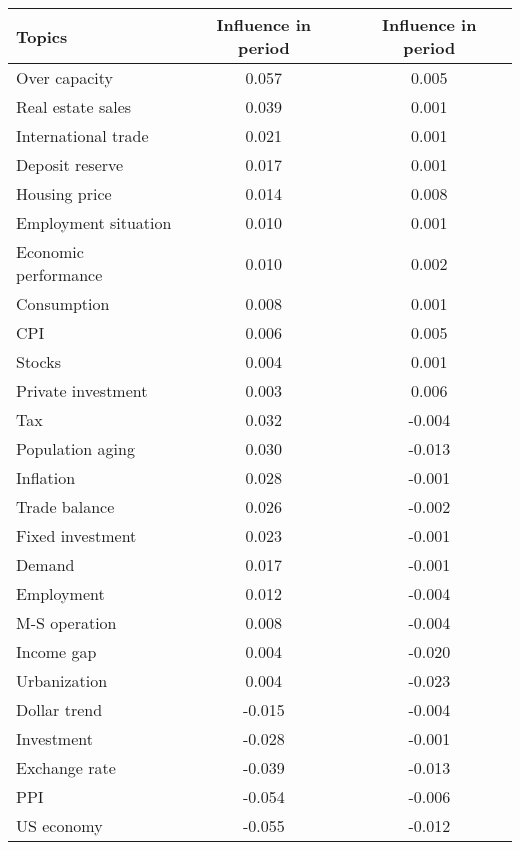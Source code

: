 \documentclass[10pt]{article}
\begin{document}
\begin {table}
 \begin {center}
 \begin {tabular} {lcc}
\hline
Topics	                         &	Influence in period 	   &	Influence in period 	\\
\hline
Over capacity	                &	0.057       &	0.005	\\
Real estate sales	        &	0.039	&	0.001	\\
International trade	        &	0.021	&	0.001	\\
Deposit reserve	                &	0.017	 &	0.001	\\
Housing price	                &	0.014	&	0.008	\\
Employment situation	&	0.010	&	0.001	\\
Economic performance	&	0.010	&	0.002	\\
Consumption	                 &	0.008	&	0.001	\\
CPI	                                  &	0.006	&	0.005	\\
Stocks	                          &	0.004	&	0.001	\\
Private investment	        &	0.003	&	0.006	\\
\hline
Tax	                                 &	0.032	&	-0.004	\\
Population aging	        &	0.030	&	-0.013	\\
Inflation	                         &	0.028	&	-0.001	\\
Trade balance	                 &	0.026	&	-0.002	\\
Fixed investment	        &	0.023	&	-0.001	\\
Demand	                        &	0.017	&	-0.001	\\
Employment	               &	0.012	&	-0.004	\\
M-S operation	               &	0.008	&	-0.004	\\
Income gap	               &	0.004	&	-0.020	\\
Urbanization	               &	0.004	&	-0.023	\\
\hline
Dollar trend	               &	-0.015	&	-0.004	\\
Investment	               &	-0.028	&	-0.001	\\
Exchange rate	                &	-0.039	&	-0.013	\\
PPI	                                &	-0.054	&	-0.006	\\
US economy	               &	-0.055	&	-0.012	\\

\end{tabular}
\end{center}
\end{table}
\end{document}
